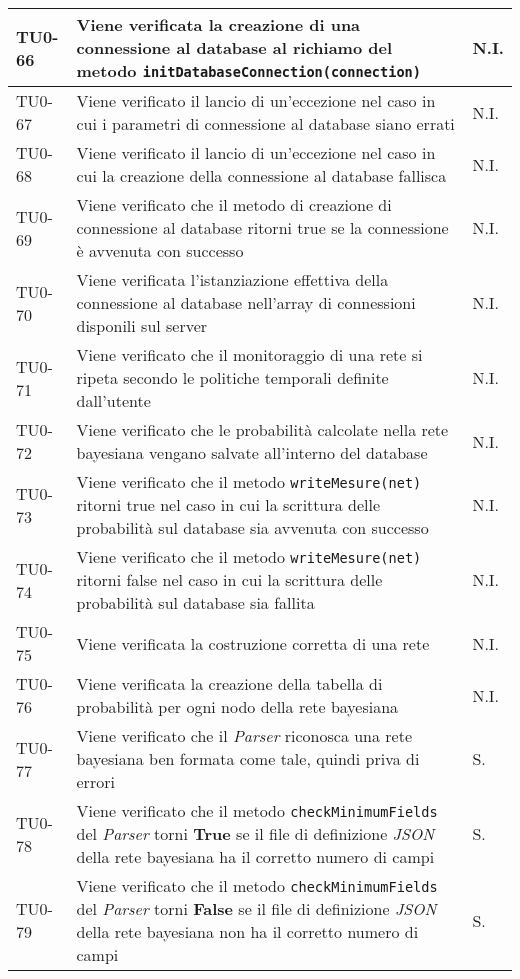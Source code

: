 \begin{longtable}{|C{.15\textwidth}|m{.65\textwidth}|C{.20\textwidth}|}
\hline
{}TU0-66 &  Viene verificata la creazione di una connessione al database al richiamo del metodo \texttt{initDatabaseConnection(connection)} & N.I.\\ 
\hline
TU0-67 & Viene verificato il lancio di un'eccezione nel caso in cui i parametri di connessione al database siano errati & N.I. \\
\hline
{} TU0-68 & Viene verificato il lancio di un'eccezione nel caso in cui la creazione della connessione al database fallisca & N.I. \\ 
\hline
TU0-69 & Viene verificato che il metodo di creazione di connessione al database ritorni true se la connessione è avvenuta con successo & N.I. \\ 
\hline 
{} TU0-70 & Viene verificata l'istanziazione effettiva della connessione al database nell'array di connessioni disponili sul server & N.I. \\ 
\hline 
TU0-71 & Viene verificato che il monitoraggio di una rete si ripeta secondo le politiche temporali definite dall'utente & N.I. \\ 
\hline 
{} TU0-72 & Viene verificato che le probabilità calcolate nella rete bayesiana vengano salvate all'interno del database  & N.I. \\ 
\hline 
TU0-73 & Viene verificato che il metodo \texttt{writeMesure(net)}  ritorni true nel caso in cui la scrittura delle probabilità sul database sia avvenuta con successo & N.I. \\
\hline
{}TU0-74 & Viene verificato che il metodo \texttt{writeMesure(net)} ritorni false nel caso in cui la scrittura delle probabilità sul database sia fallita & N.I. \\ 
\hline
TU0-75 & Viene verificata la costruzione corretta di una rete & N.I.  \\ 
\hline 
{}TU0-76 & Viene verificata la creazione della tabella di probabilità per ogni nodo della rete bayesiana & N.I. \\ 
\hline
TU0-77 & Viene verificato che il \textit{Parser} riconosca una rete bayesiana ben formata come tale, quindi priva di errori & S. \\
\hline
{}TU0-78 & Viene verificato che il metodo \texttt{checkMinimumFields} del \textit{Parser} torni \textbf{True} se il file di definizione \textit{JSON} della rete bayesiana ha il corretto numero di campi & S.\\
\hline
TU0-79 & Viene verificato che il metodo \texttt{checkMinimumFields} del \textit{Parser} torni \textbf{False} se il file di definizione \textit{JSON} della rete bayesiana non ha il corretto numero di campi & S.\\

\end{longtable}

